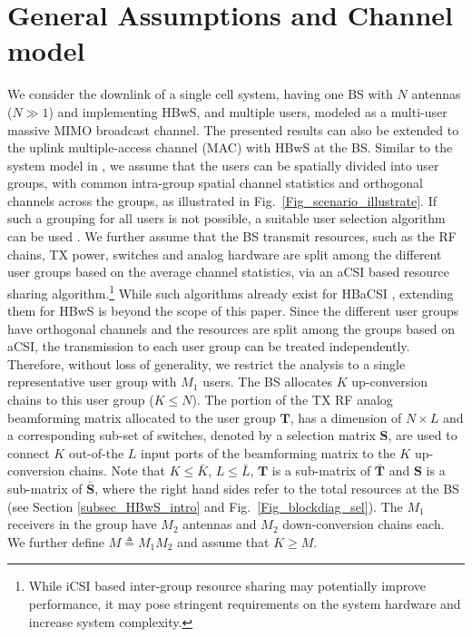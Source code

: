 \documentclass[journal,comsoc]{IEEEtran}
\begin{document}
\section{General Assumptions and Channel model} \label{sec_chan_model}
We consider the downlink of a single cell system, having one BS with $N$ antennas ($N \gg 1$) and implementing HBwS, and multiple users, modeled as a multi-user massive MIMO broadcast channel. The presented results can also be extended to the uplink multiple-access channel (MAC) with HBwS at the BS. Similar to the system model in \cite{Adhikary_JSDM}, we assume that the users can be spatially divided into user groups, with common intra-group spatial channel statistics and orthogonal channels across the groups, as illustrated in Fig.~\ref{Fig_scenario_illustrate}. If such a grouping for all users is not possible, a suitable user selection algorithm can be used \cite{Adhikary2014}. We further assume that the BS transmit resources, such as the RF chains, TX power, switches and analog hardware are split among the different user groups based on the average channel statistics, via an aCSI based resource sharing algorithm.\footnote{While iCSI based inter-group resource sharing may potentially improve performance, it may pose stringent requirements on the system hardware and increase system complexity.} While such algorithms already exist for HBaCSI \cite{Liu2014, Wang2015, Li2017}, extending them for HBwS is beyond the scope of this paper. Since the different user groups have orthogonal channels and the resources are split among the groups based on aCSI, the transmission to each user group can be treated independently. Therefore, without loss of generality, we restrict the analysis to a single representative user group with $M_1$ users. The BS allocates $K$ up-conversion chains to this user group ($K \leq N$). The portion of the TX RF analog beamforming matrix allocated to the user group $\mathbf{T}$, has a dimension of $N \times L$ and a corresponding sub-set of switches, denoted by a selection matrix $\mathbf{S}$, are used to connect $K$ out-of-the $L$ input ports of the beamforming matrix to the $K$ up-conversion chains. Note that $K \leq \bar{K}$, $L \leq \bar{L}$, $\mathbf{T}$ is a sub-matrix of $\bar{\mathbf{T}}$ and $\mathbf{S}$ is a sub-matrix of $\bar{\mathbf{S}}$, where the right hand sides refer to the total resources at the BS (see Section \ref{subsec_HBwS_intro} and Fig.~\ref{Fig_blockdiag_sel}). The $M_1$ receivers in the group have $M_2$ antennas and $M_2$ down-conversion chains each. We further define $M \triangleq M_1 M_2$ and assume that $K \geq M$. 
\end{document}
